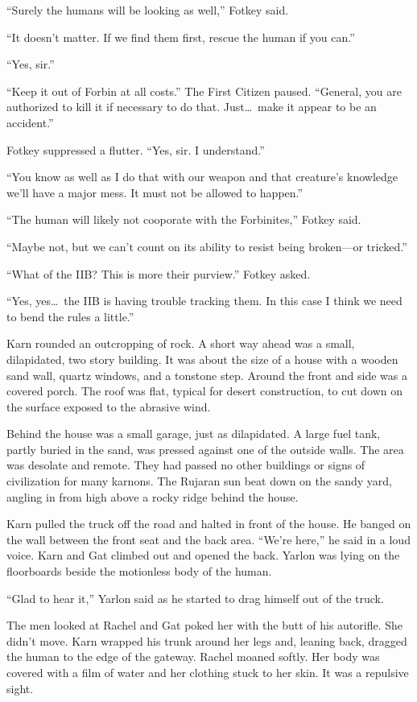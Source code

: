 ``Surely the humans will be looking as well,'' Fotkey said.

``It doesn't matter. If we find them first, rescue the human if you can.''

``Yes, sir.''

``Keep it out of Forbin at all costs.'' The First Citizen paused. ``General, you are authorized
to kill it if necessary to do that. Just\ldots\ make it appear to be an accident.''

Fotkey suppressed a flutter. ``Yes, sir. I understand.''

``You know as well as I do that with our weapon and that creature's knowledge we'll have a major
mess. It must not be allowed to happen.''

``The human will likely not cooporate with the Forbinites,'' Fotkey said.

``Maybe not, but we can't count on its ability to resist being broken---or tricked.''

``What of the IIB? This is more their purview.'' Fotkey asked.

``Yes, yes\ldots\ the IIB is having trouble tracking them. In this case I think we need to bend
the rules a little.''

\spacebreak

Karn rounded an outcropping of rock. A short way ahead was a small, dilapidated, two story
building. It was about the size of a house with a wooden sand wall, quartz windows, and a
tonstone step. Around the front and side was a covered porch. The roof was flat, typical for
desert construction, to cut down on the surface exposed to the abrasive wind.

Behind the house was a small garage, just as dilapidated. A large fuel tank, partly buried in
the sand, was pressed against one of the outside walls. The area was desolate and remote. They
had passed no other buildings or signs of civilization for many karnons. The Rujaran sun beat
down on the sandy yard, angling in from high above a rocky ridge behind the house.

Karn pulled the truck off the road and halted in front of the house. He banged on the wall
between the front seat and the back area. ``We're here,'' he said in a loud voice. Karn and Gat
climbed out and opened the back. Yarlon was lying on the floorboards beside the motionless body
of the human.

``Glad to hear it,'' Yarlon said as he started to drag himself out of the truck.

The men looked at Rachel and Gat poked her with the butt of his autorifle. She didn't move. Karn
wrapped his trunk around her legs and, leaning back, dragged the human to the edge of the
gateway. Rachel moaned softly. Her body was covered with a film of water and her clothing stuck
to her skin. It was a repulsive sight.

